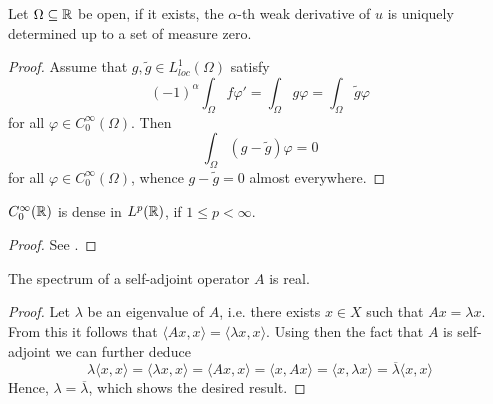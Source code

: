\begin{atheorem} \label{athem:uniqueness_of_weak_deriv}
	Let $\Omega \subseteq \mathbb{R}$ be open, if it exists, the $\alpha$-th weak derivative of $u$ is uniquely determined up to a set of measure zero.
	
	\begin{proof}
		Assume that $g, \tilde{g} \in L_{loc}^{1}(\Omega)$ satisfy
		\[ (-1)^{\alpha} \int_{\Omega} f \varphi' = \int_{\Omega} g \varphi  = \int_{\Omega} \tilde{g} \varphi  \]
		for all $\varphi \in C_{0}^{\infty}(\Omega)$. Then
		\[ \int_{\Omega} \left( g - \tilde{g} \right) \varphi = 0 \]	
		for all $\varphi \in C_{0}^{\infty}(\Omega)$, whence $g - \tilde{g} = 0$ almost everywhere.	
	\end{proof}
\end{atheorem}   

\begin{atheorem}
	$C_{0}^{\infty}(\mathbb{R})$ is dense in $L^{p}(\mathbb{R})$, if $1 \leq p < \infty$.
	
	\begin{proof}
		See \cite[page 82]{werner2006funkana}. %
	\end{proof}
\end{atheorem}

\begin{atheorem}
	The spectrum of a self-adjoint operator $A$ is real. \label{spectrul-sa-real}
	
	\begin{proof}
		Let $\lambda$ be an eigenvalue of $A$, i.e. there exists $x \in X$ such that $A x = \lambda x$. From this it follows that $\langle A x, x \rangle = \langle \lambda x , x \rangle$. Using then the fact that $A$ is self-adjoint we can further deduce
		\[ \lambda \langle x , x \rangle = \langle \lambda x , x \rangle = \langle A x, x \rangle = \langle x, A x \rangle = \langle x , \lambda x \rangle = \overline{\lambda} \langle  x , x \rangle \]
		Hence, $\lambda = \overline{\lambda}$, which shows the desired result.
	\end{proof}
\end{atheorem}

